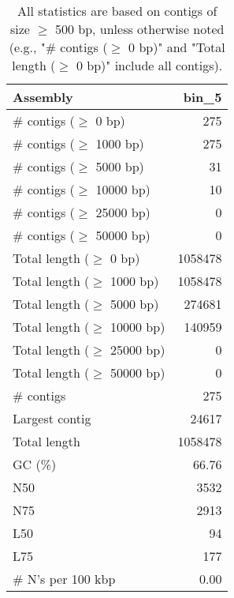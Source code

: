 \documentclass[12pt,a4paper]{article}
\begin{document}
\begin{table}[ht]
\begin{center}
\caption{All statistics are based on contigs of size $\geq$ 500 bp, unless otherwise noted (e.g., "\# contigs ($\geq$ 0 bp)" and "Total length ($\geq$ 0 bp)" include all contigs).}
\begin{tabular}{|l*{1}{|r}|}
\hline
Assembly & bin\_5 \\ \hline
\# contigs ($\geq$ 0 bp) & 275 \\ \hline
\# contigs ($\geq$ 1000 bp) & 275 \\ \hline
\# contigs ($\geq$ 5000 bp) & 31 \\ \hline
\# contigs ($\geq$ 10000 bp) & 10 \\ \hline
\# contigs ($\geq$ 25000 bp) & 0 \\ \hline
\# contigs ($\geq$ 50000 bp) & 0 \\ \hline
Total length ($\geq$ 0 bp) & 1058478 \\ \hline
Total length ($\geq$ 1000 bp) & 1058478 \\ \hline
Total length ($\geq$ 5000 bp) & 274681 \\ \hline
Total length ($\geq$ 10000 bp) & 140959 \\ \hline
Total length ($\geq$ 25000 bp) & 0 \\ \hline
Total length ($\geq$ 50000 bp) & 0 \\ \hline
\# contigs & 275 \\ \hline
Largest contig & 24617 \\ \hline
Total length & 1058478 \\ \hline
GC (\%) & 66.76 \\ \hline
N50 & 3532 \\ \hline
N75 & 2913 \\ \hline
L50 & 94 \\ \hline
L75 & 177 \\ \hline
\# N's per 100 kbp & 0.00 \\ \hline
\end{tabular}
\end{center}
\end{table}
\end{document}
